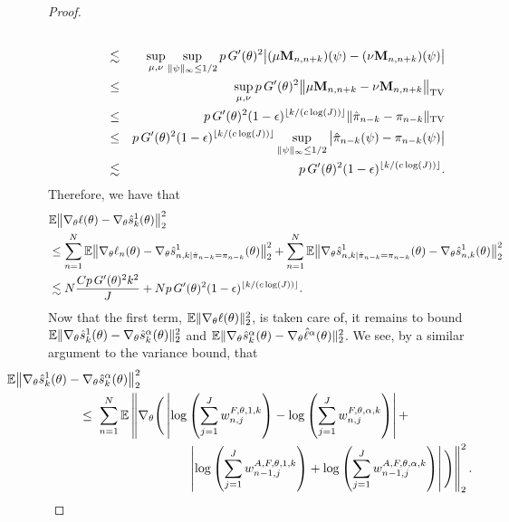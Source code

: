 \begin{proof}
\begin{eqnarray}
\\
    &\lesssim& \sup_{\mu, \nu} \sup_{\|\psi\|_\infty \leq 1/2} p \, G'(\theta)^2\big|(\mu \textbf{M}_{n,n+k})(\psi)-(\nu \textbf{M}_{n,n+k})(\psi)\big| 
\\
    &\leq& \sup_{\mu, \nu} p \, G'(\theta)^2\big\|\mu \textbf{M}_{n,n+k}-\nu \textbf{M}_{n,n+k}\big\|_{\mathrm{TV}} 
\\
    &\leq& p \, G'(\theta)^2(1-\epsilon)^{\lfloor k/(c\log(J)) \rfloor} \|\hat\pi_{n-k} - \pi_{n-k}\|_{\text{TV}} 
\\
    &\leq& p \, G'(\theta)^2(1-\epsilon)^{\lfloor k/(c\log(J)) \rfloor} \sup_{\|\psi\|_{\infty} \leq 1/2} \big|\hat\pi_{n-k}(\psi) - \pi_{n-k}(\psi)\big| 
\\
    &\lesssim& p \, G'(\theta)^2(1-\epsilon)^{\lfloor k/(c\log(J)) \rfloor}.
\end{eqnarray}
Therefore, we have that
\begin{align}
    &\mathbb{E}\big\|\nabla_\theta\ell(\theta) - \nabla_\theta\hat s_k^1(\theta)\big\|_2^2 \\
    &\leq \sum_{n=1}^N \mathbb{E}\big\|\nabla_\theta\ell_n(\theta) - \nabla_\theta\hat s_{n,k|\hat\pi_{n-k}=\pi_{n-k}}^1(\theta)\big\|_2^2 + \sum_{n=1}^N \mathbb{E}\big\|\nabla_\theta\hat s_{n,k|\hat\pi_{n-k}=\pi_{n-k}}^1(\theta) - \nabla_\theta\hat s_{n,k}^1(\theta)\big\|_2^2\\
    &\lesssim N\frac{Cp \, G'(\theta)^2k^2}{J} + Np \, G'(\theta)^2(1-\epsilon)^{\lfloor k/(c\log(J)) \rfloor}.
\end{align}
Now that the first term, $\mathbb{E}\|\nabla_\theta\ell(\theta)\|_2^2$, is taken care of, it remains to bound 
$\mathbb{E}\|\nabla_\theta\hat s_k^1(\theta) - \nabla_\theta\hat s_k^\alpha(\theta)\|_2^2$ 
and
$\mathbb{E}\|\nabla_\theta\hat s_k^\alpha(\theta) -  \nabla_\theta\hat\ell^\alpha(\theta)\|_2^2$.
We see, by a similar argument to the variance bound, that
\begin{align}
    & \hspace{-20mm} \nonumber
    \E\big\|\nabla_\theta\hat s_k^1(\theta) - \nabla_\theta\hat s_k^\alpha(\theta)\big\|_2^2
    \\ \nonumber
    &\leq \; \sum_{n=1}^N \E\left\lVert\nabla_\theta \Bigg(\left|\log\left(\sum_{j=1}^Jw_{n,j}^{F,\theta,1,k}\right)- \log\left(\sum_{j=1}^Jw_{n,j}^{F,\theta,\alpha,k}\right)\right|
    + \right.
    \\ & \hspace{30mm} \left.
    \left|\log\left(\sum_{j=1}^Jw_{n-1,j}^{A, F,\theta,1,k}\right) + \log\left(\sum_{j=1}^Jw_{n-1,j}^{A, F,\theta,\alpha,k}\right)\right|\Bigg)\right\rVert_2^2.

\end{align}
\end{proof}
